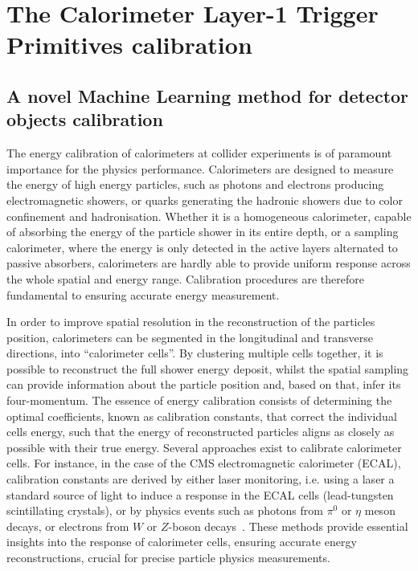 \chapter{The Calorimeter Layer-1 Trigger Primitives calibration}

\section{A novel Machine Learning method for detector objects calibration}
\label{sec:A novel Machine Learning method for detector objects calibration}

The energy calibration of calorimeters at collider experiments is of paramount importance for the physics performance.
Calorimeters are designed to measure the energy of high energy particles, such as photons and electrons producing electromagnetic showers, or quarks generating the hadronic showers due to color confinement and hadronisation. Whether it is a homogeneous calorimeter, capable of absorbing the energy of the particle shower in its entire depth, or a sampling calorimeter, where the energy is only detected in the active layers alternated to passive absorbers, calorimeters are hardly able to provide uniform response across the whole spatial and energy range. Calibration procedures are therefore fundamental to ensuring accurate energy measurement.

In order to improve spatial resolution in the reconstruction of the particles position, calorimeters can be segmented in the longitudinal and transverse directions, into ``calorimeter cells''. 
By clustering multiple cells together, it is possible to reconstruct the full shower energy deposit, whilst the spatial sampling can provide information about the particle position and, based on that, infer its four-momentum.
The essence of energy calibration consists of determining the optimal coefficients, known as calibration constants, that correct the individual cells energy, such that the energy of reconstructed particles aligns as closely as possible with their true energy. 
Several approaches exist to calibrate calorimeter cells.
For instance, in the case of the CMS electromagnetic calorimeter (ECAL), calibration constants are derived by either laser monitoring, i.e. using a laser a standard source of light to induce a response in the ECAL cells (lead-tungsten scintillating crystals), or by physics events such as photons from $\pi^0$ or $\eta$ meson decays, or electrons from $W$ or $Z$-boson decays~\cite{Cavallari:2798128}. These methods provide essential insights into the response of calorimeter cells, ensuring accurate energy reconstructions, crucial for precise particle physics measurements.

